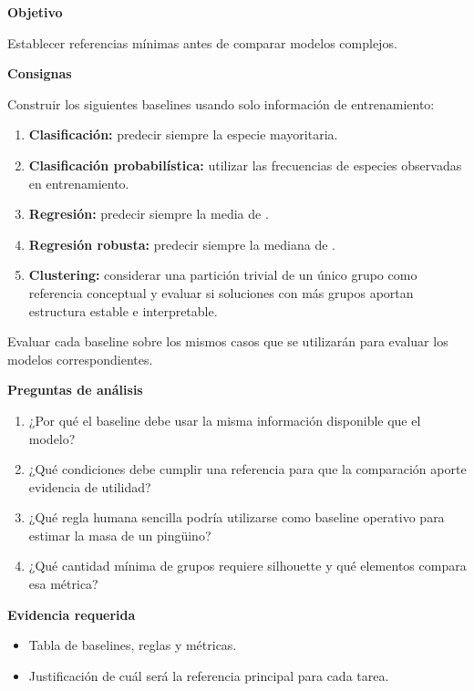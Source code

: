 \documentclass[11pt,a4paper]{article}
\newcommand{\cod}[1]{\texttt{\detokenize{#1}}}
\newcommand{\tercer}[1]{\vspace{0.9em}\noindent\textcolor{UAPTeal}{\textbf{#1}}\par\vspace{0.25em}}
\begin{document}
\tercer{Objetivo}

Establecer referencias mínimas antes de comparar modelos complejos.

\tercer{Consignas}

Construir los siguientes baselines usando solo información de entrenamiento:

\begin{enumerate}
  \item \textbf{Clasificación:} predecir siempre la especie mayoritaria.
  \item \textbf{Clasificación probabilística:} utilizar las frecuencias de especies observadas en entrenamiento.
  \item \textbf{Regresión:} predecir siempre la media de \cod{body_mass_g}.
  \item \textbf{Regresión robusta:} predecir siempre la mediana de \cod{body_mass_g}.
  \item \textbf{Clustering:} considerar una partición trivial de un único grupo como referencia conceptual y evaluar si soluciones con más grupos aportan estructura estable e interpretable.
\end{enumerate}

Evaluar cada baseline sobre los mismos casos que se utilizarán para evaluar los modelos correspondientes.

\tercer{Preguntas de análisis}

\begin{enumerate}
  \item ¿Por qué el baseline debe usar la misma información disponible que el modelo?
  \item ¿Qué condiciones debe cumplir una referencia para que la comparación aporte evidencia de utilidad?
  \item ¿Qué regla humana sencilla podría utilizarse como baseline operativo para estimar la masa de un pingüino?
  \item ¿Qué cantidad mínima de grupos requiere silhouette y qué elementos compara esa métrica?
\end{enumerate}

\tercer{Evidencia requerida}

\begin{itemize}
  \item Tabla de baselines, reglas y métricas.
  \item Justificación de cuál será la referencia principal para cada tarea.
\end{itemize}
\end{document}
